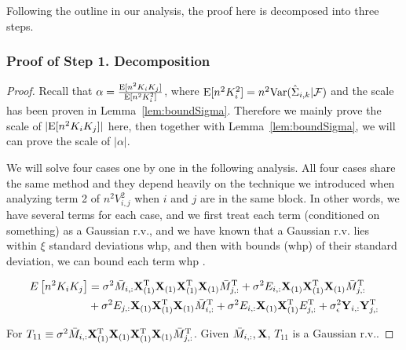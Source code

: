 Following the outline in our analysis, the proof here is decomposed into three steps.




\subsubsection{Proof of Step 1. Decomposition}

\begin{proof}

 Recall that $\alpha = \frac{ \mathrm{E}[n^2K_i K_j]}{\mathrm{E}[n^2 K^2_i]}$, where $\mathrm{E}[n^2 K^2_i] = n^2 \mathrm{Var}(\hat{\Sigma}_{i,k}|\mathcal{F})$ and the scale has been proven in Lemma~\ref{lem:boundSigma}. Therefore we mainly prove the scale of $|\mathrm{E}[n^2 K_i K_j]|$ here, then together with Lemma~\ref{lem:boundSigma}, we will can prove the scale of $|\alpha|$.


We will solve four cases one by one in the following analysis. All four cases share the same method and they depend heavily on the technique we introduced when analyzing term 2 of $n^2V^2_{i,j}$ when $i$ and $j$ are in the same block. In other words, we have several terms for each case, and we first treat each term (conditioned on something) as a Gaussian r.v., and we have known that a Gaussian r.v. lies within $\xi$ standard deviations whp, and then with bounds (whp) of their standard deviation, we can bound each term whp .



\begin{equation}
\begin{split}
    E\left[ n^2 K_i K_j \right] 
    &=  \sigma^2 \bar M_{i, :}\mathbf{X}_{(1)}^{\mathrm{T}}\mathbf{X}_{(1)}\mathbf{X}_{(1)}^{\mathrm{T}}\mathbf{X}_{(1)}\bar M^{\mathrm{T}}_{j, :}   + \sigma^2E_{i,:}\mathbf{X}_{(1)}\mathbf{X}^{\mathrm{T}}_{(1)}\mathbf{X}_{(1)}\bar M^{\mathrm{T}}_{j,:}  \\
    &+ \sigma^2E_{j,:}\mathbf{X}_{(1)}\mathbf{X}^{\mathrm{T}}_{(1)}\mathbf{X}_{(1)}\bar M^{\mathrm{T}}_{i,:}
    +\sigma^2 E_{i,:}\mathbf{X}_{(1)} \mathbf{X}_{(1)}^{\mathrm{T}} E^{\mathrm{T}}_{j,:} + \sigma^2_{\epsilon}\mathbf{Y}_{i,:}\mathbf{Y}^{\mathrm{T}}_{j,:}
\end{split}
\end{equation}

For $T_{11} \equiv \sigma^2 \bar M_{i, :}\mathbf{X}_{(1)}^{\mathrm{T}}\mathbf{X}_{(1)}\mathbf{X}_{(1)}^{\mathrm{T}}\mathbf{X}_{(1)}\bar M^{\mathrm{T}}_{j, :} $. Given $\bar M_{i,:},\mathbf{X}$, $T_{11}$ is a Gaussian r.v.. 


\end{proof}
